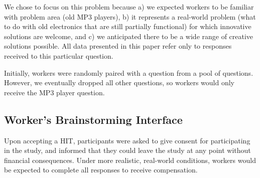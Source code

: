 
We chose to focus on this problem because a) we expected workers to be familiar with problem area (old MP3 players), b) it represents a real-world problem (what to do with old electronics that are still partially functional) for which innovative solutions are welcome, and c) we anticipated there to be a wide range of creative solutions possible. All data presented in this paper refer only to responses received to this particular question.

Initially, workers were randomly paired with a question from a pool of questions. However, we eventually dropped all other questions, so workers would only receive the MP3 player question. %


\subsection{Worker's Brainstorming Interface}

Upon accepting a HIT, participants were asked to give consent for participating in the study, and informed that they could leave the study at any point without financial consequences. Under more realistic, real-world conditions, workers would be expected to complete all responses to receive compensation.

